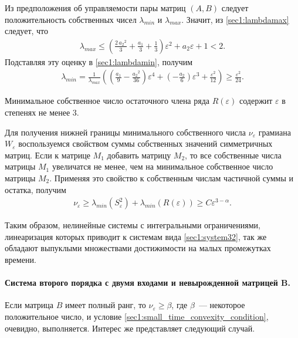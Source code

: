 \documentclass[../main.tex]{subfiles}
\begin{document}
Из предположения об управляемости пары матриц $ (A,B) $ следует положительность собственных чисел $ \lambda_{min} $ и $ \lambda_{max} $.
Значит, из \eqref{sec1:lambdamax} следует, что
\begin{gather*}
    \lambda_{max} \leq \left(\frac{2\,{a_{2}}^2}{3}+\frac{a_{1}}{3}+\frac{1}{3}\right)\varepsilon^2+a_{2}\varepsilon+1 < 2.
\end{gather*}
Подставляя эту оценку в \eqref{sec1:lambdamin}, получим
\begin{gather*}
     \lambda_{min} = \frac{1}{\lambda_{max}}\left(  \left(\frac{a_{1}}{9}-\frac{{a_{2}}^2}{36}\right)\varepsilon^4+\left(-\frac{a_{2}}{6}\right)\varepsilon^3+\frac{\varepsilon^2}{12}\right) \geq \frac{\varepsilon^2}{24}.
\end{gather*}
 
Минимальное собственное число остаточного члена ряда $ R(\varepsilon) $ содержит $ \varepsilon $ в степенях не менее 3.
 
Для получения нижней границы минимального собственного числа $ \nu_{\varepsilon} $ грамиана $ W_{\varepsilon}$ воспользуемся свойством суммы собственных значений симметричных матриц\cite{Wilkinson}.
Если к матрице $ M_1 $ добавить матрицу $ M_2 $, то все собственные числа матрицы $ M_1 $ увеличатся не менее, чем на минимальное собственное число матрицы $ M_2 $.
Применяя это свойство к собственным числам частичной суммы и остатка, получим
\begin{gather}
    \nu_{\varepsilon} \geq \lambda_{min}(S_{\varepsilon}^{2}) + \lambda_{min}(R(\varepsilon)) \geq C \varepsilon^{3-\alpha}.
\end{gather}
 
Таким образом, нелинейные системы с интегральными ограничениями, линеаризация которых приводит к системам вида \eqref{sec1:system32},  так же обладают выпуклыми множествами достижимости на малых промежутках времени.

\paragraph{Система второго порядка с двумя входами и невырожденной матрицей B.}
Если матрица $ B $ имеет полный ранг, то $\nu_{\varepsilon} \geq \beta $, где $ \beta $~--- некоторое положительное число, и условие \eqref{sec1:small_time_convexity_condition}, очевидно, выполняется.
Интерес же представляет следующий случай.
\end{document}
